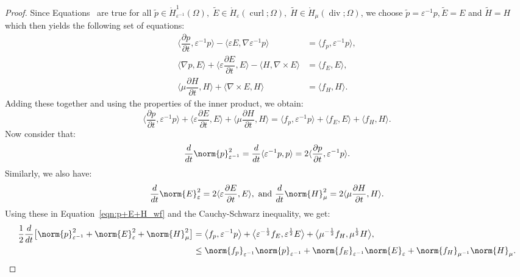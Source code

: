 \documentclass{amsart}
\theoremstyle{thmstyleone}%
\theoremstyle{thmstyletwo}%
\theoremstyle{thmstylethree}%
\DeclareMathOperator{\curl}{curl}
\def\divgn{\operatorname{div}}
\newcommand{\ainnerproduct}[2]{\langle #1, #2 \rangle}
\newcommand{\aInnerproduct}[2]{\bigl\langle #1, #2 \bigr\rangle}
\begin{document}
\begin{proof}
  Since Equations~ are true for all $\widetilde{p}\in \mathring{H}^1_{\varepsilon^{-1}}(\Omega), \; \widetilde{E} \in \mathring{H}_{\varepsilon}(\curl; \Omega), \; \widetilde{H} \in \mathring{H}_{\mu}(\divgn; \Omega)$, we choose $\widetilde{p} = \varepsilon^{-1} p, \widetilde{E} = E$ and $\widetilde{H} = H$ which then yields the following set of equations:
  \begin{align*}
      \aInnerproduct{\dfrac{\partial p}{\partial t}}{\varepsilon^{-1} p} - \aInnerproduct{ \varepsilon E}{\nabla \varepsilon^{-1} p} &= \aInnerproduct{f_p}{\varepsilon^{-1} p}, \\
      \aInnerproduct{\nabla p}{E} + \aInnerproduct{\varepsilon \dfrac{\partial E}{\partial t}}{E} - \aInnerproduct{H}{\nabla \times E} &= \aInnerproduct{f_E}{E}, \\
      \aInnerproduct{\mu \dfrac{\partial H}{\partial t}}{H} + \aInnerproduct{\nabla \times E}{H} &= \aInnerproduct{f_H}{H}.
\end{align*}
Adding these together and using the properties of the inner product, we obtain:
\begin{equation}
  \aInnerproduct{\dfrac{\partial p}{\partial t}}{\varepsilon^{-1} p} + \aInnerproduct{\varepsilon \dfrac{\partial E}{\partial t}}{E} + \aInnerproduct{\mu \dfrac{\partial H}{\partial t}}{H} = \aInnerproduct{f_p}{\varepsilon^{-1} p} + \aInnerproduct{f_E}{E} + \aInnerproduct{f_H}{H}. \label{eqn:p+E+H_wf}
\end{equation}
Now consider that:
\[
  \dfrac{d}{dt} \norm{p}^2_{\varepsilon^{-1}} = \dfrac{d}{dt} \ainnerproduct{\varepsilon^{-1}p}{p} = 2\ainnerproduct{\dfrac{\partial p}{\partial t}}{\varepsilon^{-1} p}.
\]
Similarly, we also have:
\[
  \dfrac{d}{dt} \norm{E}^2_{\varepsilon} = 2\ainnerproduct{\varepsilon \dfrac{\partial E}{\partial t}}{E}, \text{ and } \dfrac{d}{dt} \norm{H}^2_{\mu} = 2\ainnerproduct{\mu \dfrac{\partial H}{\partial t}}{H}.  \]
Using these in Equation~\eqref{eqn:p+E+H_wf} and the Cauchy-Schwarz inequality, we get:
\begin{align*}
  \dfrac{1}{2} \dfrac{d}{dt} \big[ \norm{p}^2_{\varepsilon^{-1}} + \norm{E}^2_{\varepsilon} + \norm{H}^2_{\mu} \big] &= \aInnerproduct{f_p}{\varepsilon^{-1} p} + \aInnerproduct{\varepsilon^{-\frac{1}{2}} f_E}{\varepsilon^{\frac{1}{2}} E} + \aInnerproduct{\mu^{-\frac{1}{2}} f_H}{\mu^{\frac{1}{2}} H}, \\
& \le \norm{f_p}_{\varepsilon^{-1}} \norm{p}_{\varepsilon^{-1}} + \norm{f_E}_{\varepsilon^{-1}} \norm{E}_{\varepsilon} + \norm{f_H}_{\mu^{-1}} \norm{H}_{\mu}.

\end{align*}
\end{proof}
\end{document}
